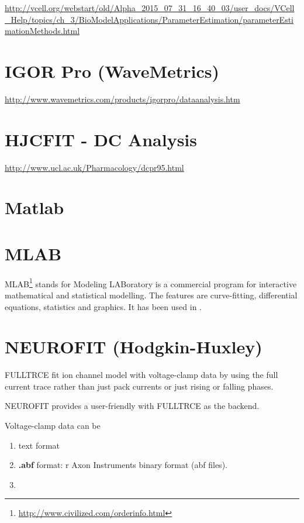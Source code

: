 \url{http://vcell.org/webstart/old/Alpha_2015_07_31_16_40_03/user_docs/VCell_Help/topics/ch_3/BioModelApplications/ParameterEstimation/parameterEstimationMethods.html}



\section{IGOR Pro (WaveMetrics)}

\url{http://www.wavemetrics.com/products/igorpro/dataanalysis.htm}


\section{HJCFIT - DC Analysis}

\url{http://www.ucl.ac.uk/Pharmacology/dcpr95.html}


\section{Matlab}

\section{MLAB}

MLAB\footnote{\url{http://www.civilized.com/orderinfo.html}} stands for Modeling
LABoratory is a commercial program for interactive mathematical and statistical
modelling. The features are curve-fitting, differential equations, statistics
and graphics. It has been used in \citep{kurebayashi1993}.

\section{NEUROFIT (Hodgkin-Huxley)}
\label{sec:NEUROFIT}

FULLTRCE fit ion channel model with voltage-clamp data by using the full current
trace rather than just pack currents or just rising or falling phases.

NEUROFIT provides a user-friendly with FULLTRCE as the backend.

Voltage-clamp data can be
\begin{enumerate}
  \item text format

  \item {\bf .abf} format: r Axon Instruments
binary format (abf files).

\item
\end{enumerate}

